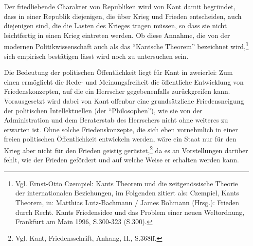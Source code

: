 \documentclass[12pt,a4paper,ngerman]{article}
\begin{document}
Der friedliebende Charakter von Republiken wird von Kant damit
begründet, dass in einer Republik diejenigen, die über Krieg und
Frieden entscheiden, auch diejenigen sind, die die Lasten des Krieges
tragen müssen, so dass sie nicht leichtfertig in einen Krieg eintreten
werden. Ob diese Annahme, die von der modernen Politikwissenschaft
auch als das "`Kantsche Theorem"' bezeichnet wird,\footnote{Vgl.
  Ernst-Otto Czempiel: Kants Theorem und die zeitgenössische Theorie
  der internationalen Beziehungen, im Folgenden zitiert als: Czempiel,
  Kants Theorem, in: Matthias Lutz-Bachmann / James Bohmann (Hrsg.):
  Frieden durch Recht. Kants Friedensidee und das Problem einer neuen
  Weltordnung, Frankfurt am Main 1996, S.300-323 (S.300).} sich
empirisch bestätigen lässt wird noch zu untersuchen sein.


Die Bedeutung der politischen Öffentlichkeit liegt für Kant in
zweierlei: Zum einen ermöglicht die Rede- und Meinungsfreiheit die
öffentliche Entwicklung von Friedenskonzepten, auf die ein Herrscher
gegebenenfalls zurückgreifen kann. Vorausgesetzt wird dabei von Kant
offenbar eine grundsätzliche Friedensneigung der politischen
Intellektuellen (der "`Philosophen"'), wie sie von der Administration
und dem Beraterstab des Herrschers nicht ohne weiteres zu erwarten
ist. Ohne solche Friedenskonzepte, die sich eben vornehmlich in
einer freien politischen Öffentlichkeit entwickeln werden, wäre ein
Staat nur für den Krieg aber nicht für den Frieden geistig
gerüstet,\footnote{Vgl. Kant, Friedensschrift, Anhang, II., S.368ff.}
da es an Vorstellungen darüber fehlt, wie der Frieden gefördert und
auf welche Weise er erhalten werden kann.
\end{document}
